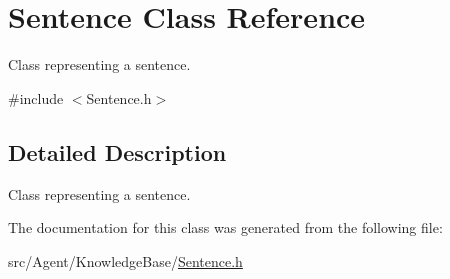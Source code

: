 \hypertarget{classSentence}{}\section{Sentence Class Reference}
\label{classSentence}


Class representing a sentence.  




{\ttfamily \#include $<$Sentence.\+h$>$}



\subsection{Detailed Description}
Class representing a sentence. 

The documentation for this class was generated from the following file\+:\begin{DoxyCompactItemize}
\item 
src/\+Agent/\+Knowledge\+Base/\mbox{\hyperlink{Sentence_8h}{Sentence.\+h}}\end{DoxyCompactItemize}
